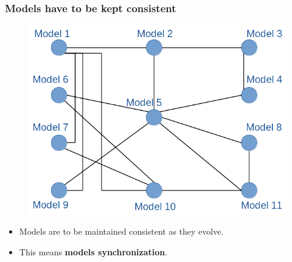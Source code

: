 \documentclass{beamer}
\begin{document}
\begin{frame}
	\frametitle{Models have to be kept consistent}
	\begin{figure}[H]
		\includegraphics[scale=0.3]{network_models_generic}
	\end{figure}
	\pause
	\begin{itemize}
		\item Models are to be maintained consistent as they evolve.
		\item This means \textbf{models synchronization}.
	\end{itemize}
\end{frame}
\end{document}

